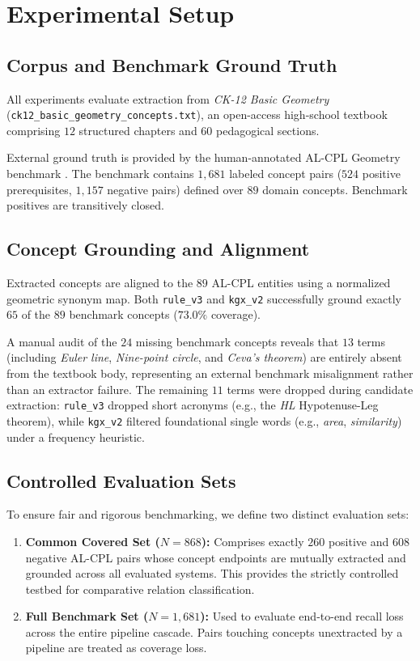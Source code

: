 \section{Experimental Setup}
\label{sec:experimental_setup}

\subsection{Corpus and Benchmark Ground Truth}
All experiments evaluate extraction from \textit{CK-12 Basic Geometry} (\texttt{ck12\_basic\_geometry\_concepts.txt}), an open-access high-school textbook comprising $12$ structured chapters and $60$ pedagogical sections. 

External ground truth is provided by the human-annotated AL-CPL Geometry benchmark \cite{liang2015prereq}. The benchmark contains $1{,}681$ labeled concept pairs ($524$ positive prerequisites, $1{,}157$ negative pairs) defined over $89$ domain concepts. Benchmark positives are transitively closed.

\subsection{Concept Grounding and Alignment}
Extracted concepts are aligned to the $89$ AL-CPL entities using a normalized geometric synonym map. Both \texttt{rule\_v3} and \texttt{kgx\_v2} successfully ground exactly $65$ of the $89$ benchmark concepts ($73.0\%$ coverage). 

A manual audit of the $24$ missing benchmark concepts reveals that $13$ terms (including \textit{Euler line}, \textit{Nine-point circle}, and \textit{Ceva's theorem}) are entirely absent from the textbook body, representing an external benchmark misalignment rather than an extractor failure. The remaining $11$ terms were dropped during candidate extraction: \texttt{rule\_v3} dropped short acronyms (e.g., the \textit{HL} Hypotenuse-Leg theorem), while \texttt{kgx_v2} filtered foundational single words (e.g., \textit{area}, \textit{similarity}) under a frequency heuristic.

\subsection{Controlled Evaluation Sets}
To ensure fair and rigorous benchmarking, we define two distinct evaluation sets:
\begin{enumerate}[leftmargin=*]
    \item \textbf{Common Covered Set ($N=868$):} Comprises exactly $260$ positive and $608$ negative AL-CPL pairs whose concept endpoints are mutually extracted and grounded across all evaluated systems. This provides the strictly controlled testbed for comparative relation classification.
    \item \textbf{Full Benchmark Set ($N=1{,}681$):} Used to evaluate end-to-end recall loss across the entire pipeline cascade. Pairs touching concepts unextracted by a pipeline are treated as coverage loss.
\end{enumerate}

